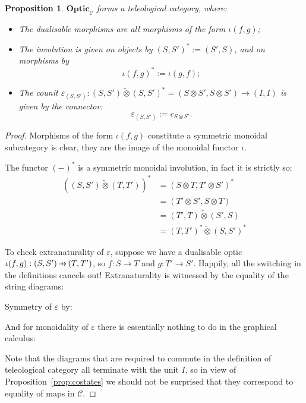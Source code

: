 \documentclass[11pt,letterpaper]{article}
\theoremstyle{plain}
\newtheorem{proposition}[theorem]{Proposition}
\theoremstyle{definition}
\newcommand{\C}{\mathscr{C}}
\newcommand{\Optic}{\mathbf{Optic}}
\newcommand{\switched}{\mathbin{\tilde{\otimes}}}
\newcommand{\hto}{\ensuremath{\,\mathaccent\shortmid\rightarrow\,}}
\begin{document}
\begin{proposition}
  $\Optic_\C$ forms a teleological category, where:
  \begin{itemize}
  \item The dualisable morphisms are all morphisms of the form $\iota(f, g)$;
  \item The involution is given on objects by ${(S, S')}^* := (S', S)$, and on morphisms by \[\iota{(f, g)}^* := \iota(g, f);\]
  \item The counit $\varepsilon_{(S, S')} : (S, S') \switched {(S, S')}^* = (S \otimes S', S \otimes S') \to (I, I)$ is given by the connector: \[\varepsilon_{(S, S')} := c_{S \otimes S'}.\]
  \end{itemize}
\end{proposition}
\begin{proof}
  Morphisms of the form $\iota(f, g)$ constitute a symmetric monoidal subcategory is clear, they are the image of the monoidal functor $\iota$.
  
  The functor ${(-)}^*$ is a symmetric monoidal involution, in fact it is strictly so:
  \begin{align*}
    {\left( (S, S') \switched (T, T') \right)}^*
    &= {\left( S \otimes T, T' \otimes S' \right)}^* \\
    &= {\left(T' \otimes S', S \otimes T  \right)} \\
    &= (T', T) \switched (S', S) \\
    &= {(T, T')}^* \switched {(S, S')}^*
  \end{align*}

  To check extranaturality of $\varepsilon$, suppose we have a dualisable optic $\iota(f, g) : (S, S') \hto (T, T')$, so $f : S \to T$ and $g : T' \to S'$. Happily, all the switching in the definitions cancels out! Extranaturality is witnessed by the equality of the string diagrams:
  \begin{center}
    
    \qquad \raisebox{1.5cm}{$=$} \qquad
    
  \end{center}
  Symmetry of $\varepsilon$ by:
  \begin{center}
    
    \qquad \raisebox{1.5cm}{$=$} \qquad
    
  \end{center}
  And for monoidality of $\varepsilon$ there is essentially nothing to do in the graphical calculus:
  \begin{center}
    
    \qquad \raisebox{2cm}{$=$} \qquad
    
  \end{center}

  Note that the diagrams that are required to commute in the definition of teleological category all terminate with the unit $I$, so in view of Proposition~\ref{prop:costates} we should not be surprised that they correspond to equality of maps in $\C$.
\end{proof}
\end{document}
